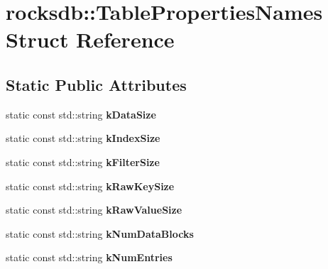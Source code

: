 \hypertarget{structrocksdb_1_1TablePropertiesNames}{}\section{rocksdb\+:\+:Table\+Properties\+Names Struct Reference}
\label{structrocksdb_1_1TablePropertiesNames}
\subsection*{Static Public Attributes}
\begin{DoxyCompactItemize}
\item 
static const std\+::string {\bfseries k\+Data\+Size}\hypertarget{structrocksdb_1_1TablePropertiesNames_abe12055e20725a0c0b8c58299b81c461}{}\label{structrocksdb_1_1TablePropertiesNames_abe12055e20725a0c0b8c58299b81c461}

\item 
static const std\+::string {\bfseries k\+Index\+Size}\hypertarget{structrocksdb_1_1TablePropertiesNames_aa9b057a1025eb06b078727f631524c16}{}\label{structrocksdb_1_1TablePropertiesNames_aa9b057a1025eb06b078727f631524c16}

\item 
static const std\+::string {\bfseries k\+Filter\+Size}\hypertarget{structrocksdb_1_1TablePropertiesNames_abf7984205794176f12800094049cdb16}{}\label{structrocksdb_1_1TablePropertiesNames_abf7984205794176f12800094049cdb16}

\item 
static const std\+::string {\bfseries k\+Raw\+Key\+Size}\hypertarget{structrocksdb_1_1TablePropertiesNames_a7fe6f4b3b52bbb3a91d281630421bc68}{}\label{structrocksdb_1_1TablePropertiesNames_a7fe6f4b3b52bbb3a91d281630421bc68}

\item 
static const std\+::string {\bfseries k\+Raw\+Value\+Size}\hypertarget{structrocksdb_1_1TablePropertiesNames_ac4e5a5740531dbb144d47b43edd13c0f}{}\label{structrocksdb_1_1TablePropertiesNames_ac4e5a5740531dbb144d47b43edd13c0f}

\item 
static const std\+::string {\bfseries k\+Num\+Data\+Blocks}\hypertarget{structrocksdb_1_1TablePropertiesNames_aa793bf4387d9fb54a95e5458ea6fc769}{}\label{structrocksdb_1_1TablePropertiesNames_aa793bf4387d9fb54a95e5458ea6fc769}

\item 
static const std\+::string {\bfseries k\+Num\+Entries}\hypertarget{structrocksdb_1_1TablePropertiesNames_abbaaa5cbb7638f9f14b9997d188d424f}{}\label{structrocksdb_1_1TablePropertiesNames_abbaaa5cbb7638f9f14b9997d188d424f}


\end{DoxyCompactItemize}
